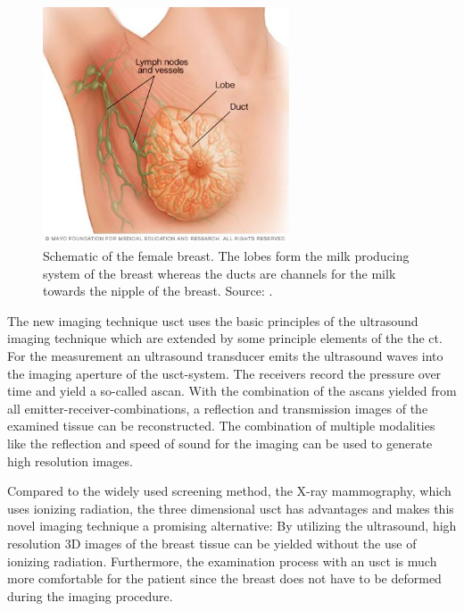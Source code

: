 

\begin{figure}[H]
    \centering
    \includegraphics[width=0.65\textwidth]{Graphics/breast.jpg}
    \caption{Schematic of the female breast. The lobes form the milk producing system of the breast whereas the ducts are channels for the milk towards the nipple of the breast. Source: \cite{mayo-clinic}. }
    \label{anatomy_breast}
\end{figure}

\hspace{-1cm}
   
The new imaging technique \ac{usct} uses the basic principles of the ultrasound imaging technique which are extended by some principle elements of the the \ac{ct}. For the measurement an ultrasound transducer emits the ultrasound waves into the imaging aperture of the \ac{usct}-system. The receivers record the pressure over time and yield a so-called \ac{ascan}. With the combination of the \acp{ascan} yielded from all emitter-receiver-combinations, a reflection and transmission images of the examined tissue can be reconstructed. The combination of multiple modalities like the reflection and speed of sound for the imaging can be used to generate high resolution images.

Compared to the widely used screening method, the X-ray mammography, which uses ionizing radiation, the three dimensional \ac{usct} has advantages and makes this novel imaging technique a promising alternative: By utilizing the ultrasound, high resolution 3D images of the breast tissue can be yielded without the use of ionizing radiation. Furthermore, the examination process with an \ac{usct} is much more comfortable for the patient since the breast does not have to be deformed during the imaging procedure. 






